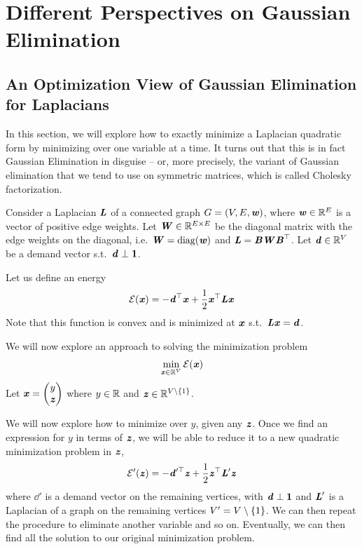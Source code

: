 \chapter{Different Perspectives on Gaussian
  Elimination}
\label{cha:ge}
%


%
\sloppy


\section{An Optimization View of Gaussian Elimination for Laplacians}
In this section, we will explore how to exactly minimize a Laplacian
quadratic form by minimizing over one variable at a time.
It turns out that this is in fact Gaussian Elimination in disguise --
or, more precisely, the variant of Gaussian elimination that we tend
to use on symmetric matrices, which is called Cholesky factorization.

Consider a Laplacian $\boldsymbol{\mathit{L}}$ of a connected graph $G = (V,E,\boldsymbol{\mathit{w}})$, where
$\boldsymbol{\mathit{w}} \in \mathbb{R}^E$ is a vector of positive edge weights.
Let $\boldsymbol{\mathit{W}} \in \mathbb{R}^{E \times E}$ be the diagonal matrix with the edge
weights on the diagonal, i.e. $\boldsymbol{\mathit{W}} = \operatorname*{diag}(\boldsymbol{\mathit{w}})$ and
$\boldsymbol{\mathit{L}} = \boldsymbol{\mathit{B}}\boldsymbol{\mathit{W}}\boldsymbol{\mathit{B}}^\top$.
Let $\boldsymbol{\mathit{d}} \in \mathbb{R}^V$ be a demand vector s.t.\ $ \boldsymbol{\mathit{d}} \perp \boldsymbol{1}$.

Let us define an energy
\[
  \mathcal{E}(\boldsymbol{\mathit{x}}) =
-\boldsymbol{\mathit{d}}^\top\boldsymbol{\mathit{x}} +
  \frac{1}{2}\boldsymbol{\mathit{x}}^\top\boldsymbol{\mathit{L}}\boldsymbol{\mathit{x}}
\]
Note that this function is convex and is minimized at $\boldsymbol{\mathit{x}}$ s.t.\ $\boldsymbol{\mathit{L}}
\boldsymbol{\mathit{x}} = \boldsymbol{\mathit{d}}$.

We will now explore an approach to solving the minimization problem
\[
\min_{\boldsymbol{\mathit{x}} \in \mathbb{R}^V } \mathcal{E}(\boldsymbol{\mathit{x}})
  \]
%
Let $\boldsymbol{\mathit{x}} =
\begin{pmatrix}
  y \\ \boldsymbol{\mathit{z}}
\end{pmatrix}$ where $y \in \mathbb{R}$ and $\boldsymbol{\mathit{z}} \in \mathbb{R}^{V \setminus
  \left\{1 \right\}}$.

We will now explore how to minimize over $y$, given any $\boldsymbol{\mathit{z}}$.
Once we find an expression for $y$ in terms of $\boldsymbol{\mathit{z}}$,
we will be able to reduce  it to a
new quadratic minimization problem in $\boldsymbol{\mathit{z}}$,
\[
  \mathcal{E}'(\boldsymbol{\mathit{z}}) =
-\boldsymbol{\mathit{d}}'^\top\boldsymbol{\mathit{z}} +
  \frac{1}{2}\boldsymbol{\mathit{z}}^\top\boldsymbol{\mathit{L}}'\boldsymbol{\mathit{z}}
\]
where $\dd'$ is a demand vector on the remaining vertices, with $\boldsymbol{\mathit{d}}
\perp \boldsymbol{1}$ and $\boldsymbol{\mathit{L}}'$ is a Laplacian of a graph on the remaining
vertices $V' = V \setminus \left\{1 \right\}$.
We can then repeat the procedure to eliminate another variable and so on.
Eventually, we can then find all the solution to our original
minimization problem.

